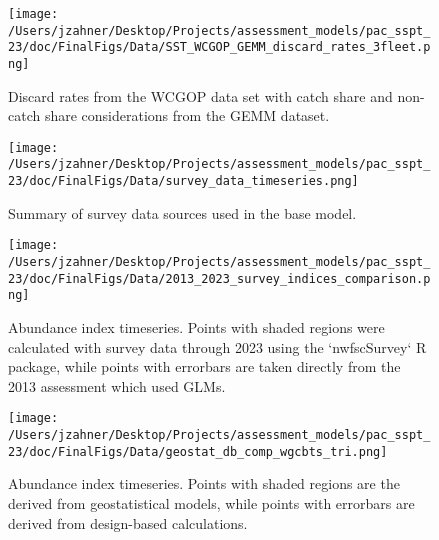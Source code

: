 \documentclass[11pt,
  letterpaper,
]{article}
\begin{document}
\begin{figure}
{\centering
\texttt{[image: /Users/jzahner/Desktop/Projects/assessment\_models/pac\_sspt\_23/doc/FinalFigs/Data/SST\_WCGOP\_GEMM\_discard\_rates\_3fleet.png]}
}
\caption{Discard rates from the WCGOP data set with catch share and non-catch share considerations from the GEMM dataset.\label{fig:disc_rates_WCGOP}}
\end{figure}

\begin{figure}
{\centering
\texttt{[image: /Users/jzahner/Desktop/Projects/assessment\_models/pac\_sspt\_23/doc/FinalFigs/Data/survey\_data\_timeseries.png]}
}
\caption{Summary of survey data sources used in the base model.\label{fig:survey_data_timeseries}}
\end{figure}

\begin{figure}
{\centering
\texttt{[image: /Users/jzahner/Desktop/Projects/assessment\_models/pac\_sspt\_23/doc/FinalFigs/Data/2013\_2023\_survey\_indices\_comparison.png]}
}
\caption{Abundance index timeseries. Points with shaded regions were calculated with survey data through 2023 using the `nwfscSurvey` R package, while points with errorbars are taken directly from the 2013 assessment which used GLMs.\label{fig:designbasedsurv}}
\end{figure}

\begin{figure}
{\centering
\texttt{[image: /Users/jzahner/Desktop/Projects/assessment\_models/pac\_sspt\_23/doc/FinalFigs/Data/geostat\_db\_comp\_wgcbts\_tri.png]}
}
\caption{Abundance index timeseries. Points with shaded regions are the derived from geostatistical models, while points with errorbars are derived from design-based calculations.\label{fig:modelbasedsurv}}
\end{figure}
\end{document}
